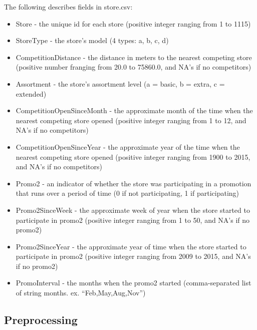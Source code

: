 \documentclass[letterpaper,twocolumn,10pt]{article}
\begin{document}
The following describes fields in store.csv:
\begin{itemize}
\item Store - the unique id for each store (positive integer ranging from 1 to 1115)
\item StoreType - the store's model (4 types: a, b, c, d)
\item CompetitionDistance - the distance in meters to the nearest competing store (positive number franging from 20.0 to 75860.0, and NA's if no competitors)
\item Assortment - the store's assortment level (a = basic, b = extra, c = extended)
\item CompetitionOpenSinceMonth - the approximate month of the time when the nearest competing store opened (positive integer ranging from 1 to 12, and NA's if no competitors)
\item CompetitionOpenSinceYear - the approximate year of the time when the nearest competing store opened (positive integer ranging from 1900 to 2015, and NA's if no competitors)
\item Promo2 - an indicator of whether the store was participating in a promotion that runs over a period of time  (0 if not participating, 1 if participating)
\item Promo2SinceWeek - the approximate week of year when the store started to participate in promo2 (positive integer ranging from 1 to 50, and NA's if no promo2)
\item Promo2SinceYear - the approximate year of time when the store started to participate in promo2 (positive integer ranging from 2009 to 2015, and NA's if no promo2)
\item PromoInterval - the months when the promo2 started (comma-separated list of string months. ex. ``Feb,May,Aug,Nov'')
\end{itemize}

\subsection{Preprocessing}
\end{document}
